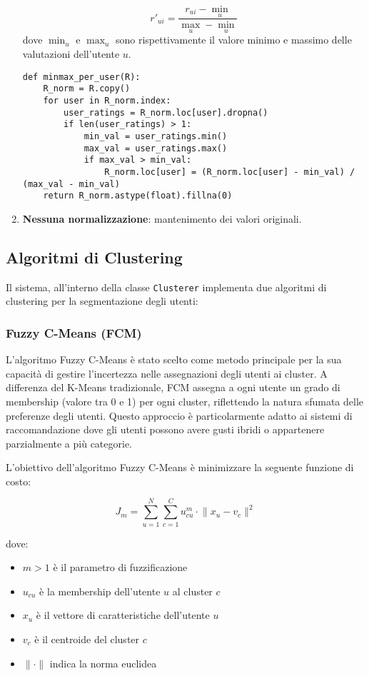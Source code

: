 \begin{enumerate}
    \[
    r'_{ui} = \frac{r_{ui} - \min_u}{\max_u - \min_u}
    \]
    dove $\min_u$ e $\max_u$ sono rispettivamente il valore minimo e massimo delle valutazioni dell’utente $u$.

    \begin{lstlisting}[style=PythonStyle, caption=Normalizzazione: Min-Max]
def minmax_per_user(R):
    R_norm = R.copy()
    for user in R_norm.index:
        user_ratings = R_norm.loc[user].dropna()
        if len(user_ratings) > 1:
            min_val = user_ratings.min()
            max_val = user_ratings.max()
            if max_val > min_val:
                R_norm.loc[user] = (R_norm.loc[user] - min_val) / (max_val - min_val)
    return R_norm.astype(float).fillna(0)
    \end{lstlisting}
    
    \item \textbf{Nessuna normalizzazione}: mantenimento dei valori originali.
\end{enumerate}


\subsection{Algoritmi di Clustering}

Il sistema, all'interno della classe \texttt{Clusterer} implementa due algoritmi di clustering per la segmentazione degli utenti:

\subsubsection{Fuzzy C-Means (FCM)}
L'algoritmo Fuzzy C-Means è stato scelto come metodo principale per la sua capacità di gestire l'incertezza nelle assegnazioni degli utenti ai cluster. A differenza del K-Means tradizionale, FCM assegna a ogni utente un grado di membership (valore tra 0 e 1) per ogni cluster, riflettendo la natura sfumata delle preferenze degli utenti. Questo approccio è particolarmente adatto ai sistemi di raccomandazione dove gli utenti possono avere gusti ibridi o appartenere parzialmente a più categorie.

L'obiettivo dell’algoritmo Fuzzy C-Means è minimizzare la seguente funzione di costo:

\[
J_m = \sum_{u=1}^{N} \sum_{c=1}^{C} u_{cu}^m \cdot \lVert x_u - v_c \rVert^2
\]

dove:
\begin{itemize}
    \item $m > 1$ è il parametro di fuzzificazione
    \item $u_{cu}$ è la membership dell’utente $u$ al cluster $c$
    \item $x_u$ è il vettore di caratteristiche dell’utente $u$
    \item $v_c$ è il centroide del cluster $c$
    \item $\lVert \cdot \rVert$ indica la norma euclidea
\end{itemize}

